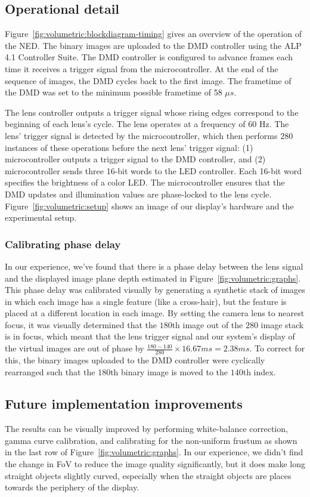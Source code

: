 
\subsection{Operational detail}
Figure~\ref{fig:volumetric:blockdiagram-timing} gives an overview of the operation of the NED. The binary images are uploaded to the DMD controller using the ALP 4.1 Controller Suite. The DMD controller is configured to advance frames each time it receives a trigger signal from the microcontroller. At the end of the sequence of images, the DMD cycles back to the first image. The frametime of the DMD was set to the minimum possible frametime of 58 $\mu s$.

The lens controller outputs a trigger signal whose rising edges correspond to the beginning of each lens's cycle. The lens operates at a frequency of 60 Hz. The lens' trigger signal is detected by the microcontroller, which then performs $280$ instances of these operations before the next lens' trigger signal: (1) microcontroller outputs a trigger signal to the DMD controller, and (2) microcontroller sends three 16-bit words to the LED controller. Each 16-bit word specifies the brightness of a color LED. The microcontroller ensures that the DMD updates and illumination values are phase-locked to the lens cycle. Figure~\ref{fig:volumetric:setup} shows an image of our display's hardware and the experimental setup. 

\subsubsection{Calibrating phase delay}
In our experience, we've found that there is a phase delay between the lens signal and the displayed image plane depth estimated in Figure~\ref{fig:volumetric:graphs}. This phase delay was calibrated visually by generating a synthetic stack of images in which each image has a single feature (like a cross-hair), but the feature is placed at a different location in each image. By setting the camera lens to nearest focus, it was visually determined that the $180$th image out of the $280$ image stack is in focus, which meant that the lens trigger signal and our system's display of the virtual images are out of phase by $\frac{180 - 140}{280} \times 16.67ms = 2.38 ms$. To correct for this, the binary images uploaded to the DMD controller were cyclically rearranged such that the $180$th binary image is moved to the $140$th index.

\subsection{Future implementation improvements}
The results can be visually improved by performing white-balance correction, gamma curve calibration, and calibrating for the non-uniform frustum as shown in the last row of Figure~\ref{fig:volumetric:graphs}. In our experience, we didn't find the change in FoV to reduce the image quality significantly, but it does make long straight objects slightly curved, especially when the straight objects are places towards the periphery of the display. 
